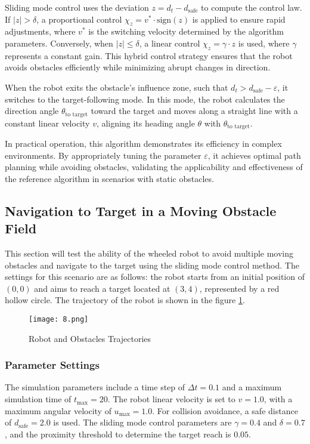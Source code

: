Sliding mode control uses the deviation $z = d_t - d_{\text{safe}}$ to compute the control law. If $|z| > \delta$, a proportional control $\chi_z = v^* \cdot \text{sign}(z)$ is applied to ensure rapid adjustments, where $v^*$ is the switching velocity determined by the algorithm parameters. Conversely, when $|z| \leq \delta$, a linear control $\chi_z = \gamma \cdot z$ is used, where $\gamma$ represents a constant gain. This hybrid control strategy ensures that the robot avoids obstacles efficiently while minimizing abrupt changes in direction.

When the robot exits the obstacle's influence zone, such that $d_t > d_{\text{safe}} - \varepsilon$, it switches to the target-following mode. In this mode, the robot calculates the direction angle $\theta_{\text{to target}}$ toward the target and moves along a straight line with a constant linear velocity $v$, aligning its heading angle $\theta$ with $\theta_{\text{to target}}$.

In practical operation, this algorithm demonstrates its efficiency in complex environments. By appropriately tuning the parameter $\varepsilon$, it achieves optimal path planning while avoiding obstacles, validating the applicability and effectiveness of the reference algorithm in scenarios with static obstacles.


\subsection{Navigation to Target in a Moving Obstacle Field}

This section will test the ability of the wheeled robot to avoid multiple moving obstacles and navigate to the target using the sliding mode control method. The settings for this scenario are as follows: the robot starts from an initial position of $(0, 0)$ and aims to reach a target located at $(3, 4)$, represented by a red hollow circle. The trajectory of the robot is shown in the figure \ref{FIG:8}.

\begin{figure}[H]
    \centering
    \texttt{[image: 8.png]}
    \caption{Robot and Obstacles Trajectories}
    \label{FIG:8}
\end{figure}

\subsubsection{Parameter Settings}

The simulation parameters include a time step of $\Delta t = 0.1$ and a maximum simulation time of $t_{\text{max}} = 20$. The robot linear velocity is set to $v = 1.0$, with a maximum angular velocity of $u_{\text{max}} = 1.0$. For collision avoidance, a safe distance of $d_{\text{safe}} = 2.0$ is used. The sliding mode control parameters are $\gamma = 0.4$ and $\delta = 0.7$, and the proximity threshold to determine the target reach is $0.05$. 

